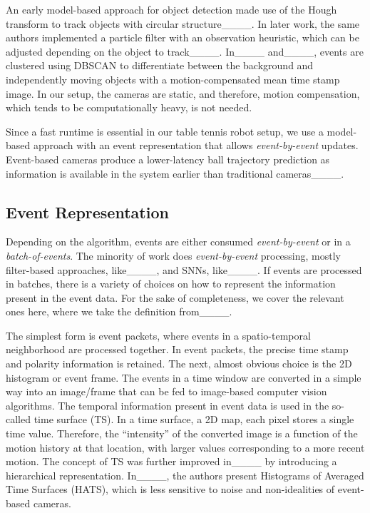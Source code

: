 An early model-based approach for object detection made use of the Hough transform to track objects with circular structure____.
%
In later work, the same authors implemented a particle filter with an observation heuristic, which can be adjusted depending on the object to track____.
%
In____ and____, events are clustered using DBSCAN to differentiate between the background and independently moving objects with a motion-compensated mean time stamp image.
%
In our setup, the cameras are static, and therefore, motion compensation, which tends to be computationally heavy, is not needed.

Since a fast runtime is essential in our table tennis robot setup, we use a model-based approach with an event representation that allows \textit{event-by-event} updates.
%
Event-based cameras produce a lower-latency ball trajectory prediction as information is available in the system earlier than traditional cameras____. 


\subsection{Event Representation}\label{subsec:rel_er}

Depending on the algorithm, events are either consumed \textit{event-by-event} or in a \textit{batch-of-events}.
%
The minority of work does \textit{event-by-event} processing, mostly filter-based approaches, like____, and \acp{SNN}, like____.
%
If events are processed in batches, there is a variety of choices on how to represent the information present in the event data.
%
For the sake of completeness, we cover the relevant ones here, where we take the definition from____.

The simplest form is event packets, where events in a spatio-temporal neighborhood are processed together.
%
In event packets, the precise time stamp and polarity information is retained.
%
The next, almost obvious choice is the 2D histogram or event frame.
%
The events in a time window are converted in a simple way into an image/frame that can be fed to image-based computer vision algorithms.
%
The temporal information present in event data is used in the so-called time surface (TS).
%
In a time surface, a 2D map, each pixel stores a single time value.
%
Therefore, the ``intensity'' of the converted image is a function of the motion history at that location, with larger values corresponding to a more recent motion.
%
The concept of TS was further improved in____ by introducing a hierarchical representation.
%
In____, the authors present Histograms of Averaged Time Surfaces (HATS), which is less sensitive to noise and non-idealities of event-based cameras.

